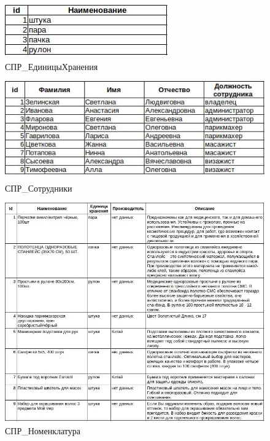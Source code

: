 \begin{figure}[!h]
    \centering

    \includegraphics[]
    {assets/etalons/CPR_EdinicyHraneniay.jpg}

    \caption{СПР\_ЕдиницыХранения}

    \label{fig:CPR_EdinicyHraneniay}
\end{figure}

\begin{figure}[!h]
    \centering

    \includegraphics[]
    {assets/etalons/CPR_Sotrudniki.jpg}

    \caption{СПР\_Сотрудники}

    \label{fig:CPR_Sotrudniki}
\end{figure}

\begin{figure}[!h]
    \centering

    \includegraphics[width=17cm]
    {assets/etalons/CPR_Nomenklatura.jpg}

    \caption{СПР\_Номенклатура}

    \label{fig:CPR_Nomenklatura}
\end{figure}

